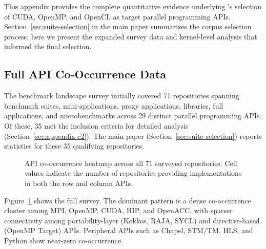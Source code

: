 This appendix provides the complete quantitative evidence underlying \parbench{}'s selection of CUDA, OpenMP, and OpenCL as target parallel programming APIs. Section~\ref{sec:suite-selection} in the main paper summarizes the corpus selection process; here we present the expanded survey data and kernel-level analysis that informed the final selection.

\subsection{Full API Co-Occurrence Data}
\label{sec:appendix-b1}
The benchmark landscape survey initially covered 71 repositories spanning benchmark suites, mini-applications, proxy applications, libraries, full applications, and microbenchmarks across 29 distinct parallel programming APIs. Of these, 35 met the inclusion criteria for detailed analysis (Section~\ref{sec:appendix-c2}). The main paper (Section~\ref{sec:suite-selection}) reports statistics for these 35 qualifying repositories.

\begin{figure}[htbp]
\centering

\caption{API co-occurrence heatmap across all 71 surveyed repositories. Cell values indicate the number of repositories providing implementations in both the row and column APIs.}
\label{fig:api-heatmap}
\end{figure}

Figure~\ref{fig:api-heatmap} shows the full survey. The dominant pattern is a dense co-occurrence cluster among MPI, OpenMP, CUDA, HIP, and OpenACC, with sparser connectivity among portability-layer (Kokkos, RAJA, SYCL) and directive-based (OpenMP Target) APIs. Peripheral APIs such as Chapel, STM/TM, HLS, and Python show near-zero co-occurrence.

